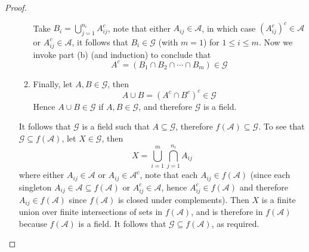 \documentclass[12pt]{article}
\newcommand{\A}{\mathcal{A}}
\newcommand{\G}{\mathcal{G}}
\newcommand{\seq}{\subseteq}
\newcommand{\un}{\cup}
\newcommand{\ic}{\cap}
\begin{document}
\begin{proof}
\begin{enumerate}
\begin{enumerate}
            Take $B_{i} = \bigcup_{j=1}^{n_i} A_{ij}^{c}$, note that either $A_{ij} \in \A$, in which case $(A_{ij}^{c})^c \in \A$ or $A_{ij}^{c} \in \A$, it follows that $B_i \in \G$ (with $m = 1$) for $1 \leq i \leq m$. Now we invoke part (b) (and induction) to conclude that
            \[ A^{c} = \left (B_1 \ic B_2 \ic \cdots \ic B_m \right) \in \G \] 
            \item Finally, let $A, B \in \G$, then
            \[ A \un B = (A^{c} \ic B^{c})^{c} \in \G \]
            Hence $A \un B \in \G$ if $A, B \in \G$, and therefore $\G$ is a field.
        \end{enumerate}
        It follows that $\G$ is a field such that $A \seq \G$, therefore $f(\A) \seq \G$. To see that $\G \seq f(\A)$, let $X \in \G$, then
        \[ X = \bigcup_{i=1}^{m} \bigcap_{j=1}^{n_i} A_{ij} \]
        where either $A_{ij} \in \A$ or $A_{ij} \in \A^{c}$, note that each $A_{ij} \in f(\A)$ (since each singleton $A_{ij} \in \A \seq f(\A)$ or $A_{ij}^{c} \in \A$, hence $A_{ij}^{c} \in f(\A)$ and therefore $A_{ij} \in f(\A)$ since $f(\A)$ is closed under complements). Then $X$ is a finite union over finite intersections of sets in $f(\A)$, and is therefore in $f(\A)$ because $f(\A)$ is a field. It follows that $\G \seq f(\A)$, as required. 
    \end{enumerate}
\end{proof}
\end{document}
